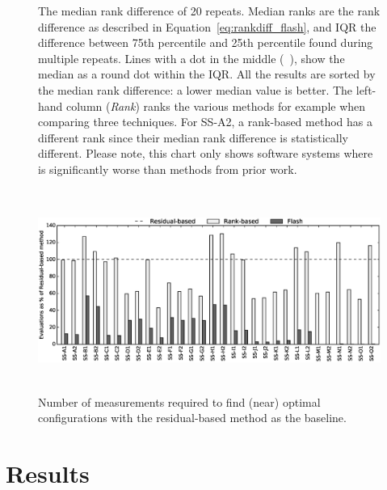 \begin{figure}[tbh]
{}
    
    \caption[The median rank difference of 20 repeats to compare residual-based, rank-based and \flash.]{
        {\small 
            The median rank difference of 20 repeats. Median ranks are the rank difference as described in Equation~\ref{eq:rankdiff_flash}, and IQR the difference between 75th percentile and 25th percentile found during multiple repeats. 
            Lines with a dot in the middle 
            (~\protect{}), 
            show the median as a round dot within the IQR.
            All the results are sorted by the median rank difference: a lower median value is better. 
            The left-hand column (\textit{Rank}) ranks the various methods for example when comparing three techniques. For SS-A2, a rank-based method has a different rank since their median rank difference is statistically different. Please note, this chart only shows software systems where \flash is significantly worse than methods from prior work.
        }
    }
    \label{fig:stat-test_flash}
\end{figure}

\begin{figure}[t]
        \centering
        \includegraphics[width=0.7\paperwidth, height=6.6cm]{Chapter-Flash/figures/one_obj_evals.eps}

        \caption{
        \small{
        Number of measurements required to find (near) optimal configurations with the residual-based method as the baseline.\vspace{5mm}}
        }\label{fig:evals_flash}
\end{figure}

\section{Results}
